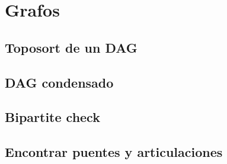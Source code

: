 \section{Grafos}
    \subsection{Toposort de un DAG}
    

    \subsection{DAG condensado}
    

    \subsection{Bipartite check}
    

    \subsection{Encontrar puentes y articulaciones}
    

    